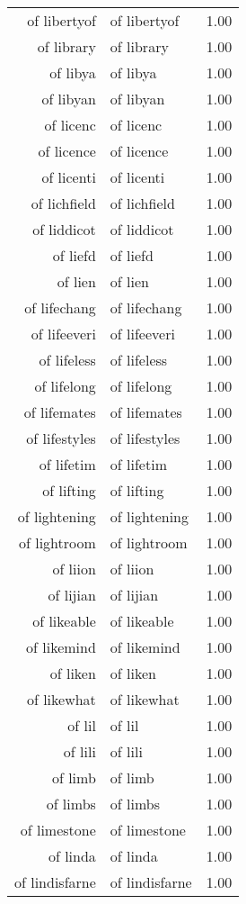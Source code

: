 \begin{table}[ht]
\begin{tabular}{rlr}
  of libertyof & of libertyof & 1.00 \\ 
  of library & of library & 1.00 \\ 
  of libya & of libya & 1.00 \\ 
  of libyan & of libyan & 1.00 \\ 
  of licenc & of licenc & 1.00 \\ 
  of licence & of licence & 1.00 \\ 
  of licenti & of licenti & 1.00 \\ 
  of lichfield & of lichfield & 1.00 \\ 
  of liddicot & of liddicot & 1.00 \\ 
  of liefd & of liefd & 1.00 \\ 
  of lien & of lien & 1.00 \\ 
  of lifechang & of lifechang & 1.00 \\ 
  of lifeeveri & of lifeeveri & 1.00 \\ 
  of lifeless & of lifeless & 1.00 \\ 
  of lifelong & of lifelong & 1.00 \\ 
  of lifemates & of lifemates & 1.00 \\ 
  of lifestyles & of lifestyles & 1.00 \\ 
  of lifetim & of lifetim & 1.00 \\ 
  of lifting & of lifting & 1.00 \\ 
  of lightening & of lightening & 1.00 \\ 
  of lightroom & of lightroom & 1.00 \\ 
  of liion & of liion & 1.00 \\ 
  of lijian & of lijian & 1.00 \\ 
  of likeable & of likeable & 1.00 \\ 
  of likemind & of likemind & 1.00 \\ 
  of liken & of liken & 1.00 \\ 
  of likewhat & of likewhat & 1.00 \\ 
  of lil & of lil & 1.00 \\ 
  of lili & of lili & 1.00 \\ 
  of limb & of limb & 1.00 \\ 
  of limbs & of limbs & 1.00 \\ 
  of limestone & of limestone & 1.00 \\ 
  of linda & of linda & 1.00 \\ 
  of lindisfarne & of lindisfarne & 1.00 \\ 

\end{tabular}
\end{table}
